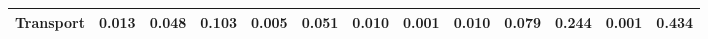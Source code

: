 \begin{table}[htbp]
\begin{tabular}{lcccccccccccc}
  Transport & \textcolor[RGB]{198,128,57}{0.013} & \textcolor[RGB]{115,74,140}{0.048} & \textcolor[RGB]{66,42,189}{0.103} & \textcolor[RGB]{218,141,37}{0.005} & \textcolor[RGB]{110,71,145}{0.051} & \textcolor[RGB]{205,133,50}{0.010} & \textcolor[RGB]{250,162,5}{0.001} & \textcolor[RGB]{207,134,48}{0.010} & \textcolor[RGB]{80,52,175}{0.079} & \textcolor[RGB]{21,14,234}{0.244} & \textcolor[RGB]{248,160,7}{0.001} & \textcolor[RGB]{4,2,251}{0.434} \\ 
   \hline
\end{tabular}
\end{table}

